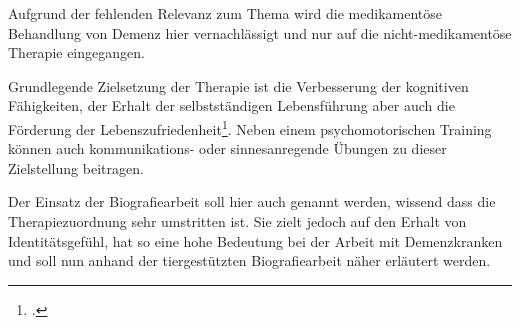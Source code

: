 Aufgrund der fehlenden Relevanz zum Thema wird die medikamentöse Behandlung von Demenz hier vernachlässigt und nur auf die nicht-medikamentöse Therapie eingegangen.

Grundlegende Zielsetzung der Therapie ist die Verbesserung der kognitiven Fähigkeiten, der Erhalt der selbstständigen Lebensführung aber auch die Förderung der Lebenszufriedenheit\footcite{Hegedusch2007}. Neben einem psychomotorischen Training können auch kommunikations- oder sinnesanregende Übungen zu dieser Zielstellung beitragen. 

Der Einsatz der Biografiearbeit soll hier auch genannt werden, wissend dass die Therapiezuordnung sehr umstritten ist. Sie zielt jedoch auf den Erhalt von Identitätsgefühl, hat so eine hohe Bedeutung bei der Arbeit mit Demenzkranken und soll nun anhand der tiergestützten Biografiearbeit näher erläutert werden.
